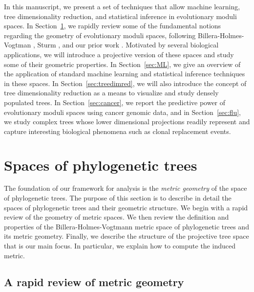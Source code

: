 \documentclass[a4paper,11pt]{article}
\begin{document}
In this manuscript, we present a set of techniques that allow machine learning, tree dimensionality reduction, and statistical inference in evolutionary moduli spaces.
In Section~\ref{sec:phylospace}, we rapidly review some of the fundamental notions regarding the geometry of evolutionary moduli spaces, following Billera-Holmes-Vogtman \cite{billera2001geometry}, Sturm \cite{sturm2003probability}, and our prior work \cite{zairis2014moduli}.
Motivated by several biological applications, we will introduce a projective version of these spaces and study some of their geometric properties.
In Section~\ref{sec:ML}, we give an overview of the application of standard machine learning and statistical inference techniques in these spaces.
In Section~\ref{sec:treedimred}, we will also introduce the concept of tree dimensionality reduction as a means to visualize and study densely populated trees.
In Section~\ref{sec:cancer}, we report the predictive power of evolutionary moduli spaces using cancer genomic data, and in Section~\ref{sec:flu}, we study complex trees whose lower dimensional projections readily represent and capture interesting biological phenomena such as clonal replacement events.



\section{Spaces of phylogenetic trees}\label{sec:phylospace}

The foundation of our framework for analysis is the {\em metric geometry} of the space of phylogenetic trees.
The purpose of this section is to describe in detail the spaces of phylogenetic trees and their geometric structure.
We begin with a rapid review of the geometry of metric spaces.
We then review the definition and properties of the Billera-Holmes-Vogtmann metric space of phylogenetic trees and its metric geometry.
Finally, we describe the structure of the projective tree space that is our main focus.
In particular, we explain how to compute the induced metric.

\subsection{A rapid review of metric geometry}
\end{document}
